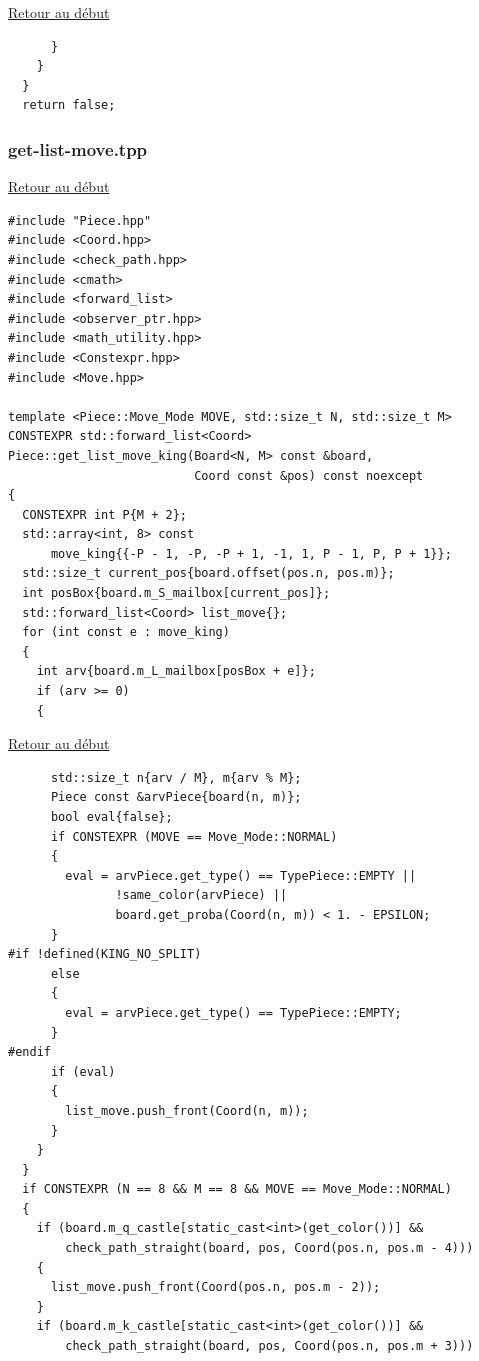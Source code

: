 {\begin{frame}[fragile]
\hyperlink{conclusion}{Retour au début}\newline
\begin{verbatim}
      }
    }
  }
  return false;

\end{verbatim}
\end{frame}

\begin{frame}[fragile]
\label{getlistmove.tpp}
\frametitle{get-list-move.tpp}
\hyperlink{conclusion}{Retour au début}\newline
\begin{verbatim}
#include "Piece.hpp"
#include <Coord.hpp>
#include <check_path.hpp>
#include <cmath>
#include <forward_list>
#include <observer_ptr.hpp>
#include <math_utility.hpp>
#include <Constexpr.hpp>
#include <Move.hpp>

template <Piece::Move_Mode MOVE, std::size_t N, std::size_t M>
CONSTEXPR std::forward_list<Coord>
Piece::get_list_move_king(Board<N, M> const &board,
                          Coord const &pos) const noexcept
{
  CONSTEXPR int P{M + 2};
  std::array<int, 8> const
      move_king{{-P - 1, -P, -P + 1, -1, 1, P - 1, P, P + 1}};
  std::size_t current_pos{board.offset(pos.n, pos.m)};
  int posBox{board.m_S_mailbox[current_pos]};
  std::forward_list<Coord> list_move{};
  for (int const e : move_king)
  {
    int arv{board.m_L_mailbox[posBox + e]};
    if (arv >= 0)
    {
\end{verbatim}
\end{frame}

\begin{frame}[fragile]
\hyperlink{conclusion}{Retour au début}\newline
\begin{verbatim}
      std::size_t n{arv / M}, m{arv % M};
      Piece const &arvPiece{board(n, m)};
      bool eval{false};
      if CONSTEXPR (MOVE == Move_Mode::NORMAL)
      {
        eval = arvPiece.get_type() == TypePiece::EMPTY ||
               !same_color(arvPiece) ||
               board.get_proba(Coord(n, m)) < 1. - EPSILON;
      }
#if !defined(KING_NO_SPLIT)
      else
      {
        eval = arvPiece.get_type() == TypePiece::EMPTY;
      }
#endif
      if (eval)
      {
        list_move.push_front(Coord(n, m));
      }
    }
  }
  if CONSTEXPR (N == 8 && M == 8 && MOVE == Move_Mode::NORMAL)
  {
    if (board.m_q_castle[static_cast<int>(get_color())] &&
        check_path_straight(board, pos, Coord(pos.n, pos.m - 4)))
    {
      list_move.push_front(Coord(pos.n, pos.m - 2));
    }
    if (board.m_k_castle[static_cast<int>(get_color())] &&
        check_path_straight(board, pos, Coord(pos.n, pos.m + 3)))
\end{verbatim}
\end{frame}

}
